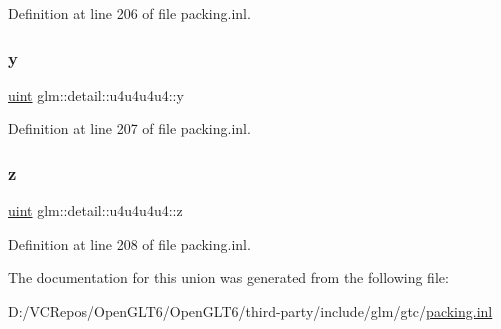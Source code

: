 Definition at line 206 of file packing.\+inl.

\mbox{\label{unionglm_1_1detail_1_1u4u4u4u4_a1c5a971d31d261db43863e8e95d81ecb}} 
\subsubsection{\texorpdfstring{y}{y}}
{\footnotesize\ttfamily \mbox{\hyperlink{group__core__precision_ga4fd29415871152bfb5abd588334147c8}{uint}} glm\+::detail\+::u4u4u4u4\+::y}



Definition at line 207 of file packing.\+inl.

\mbox{\label{unionglm_1_1detail_1_1u4u4u4u4_a1635b8d41a367114239565da102ad6b9}} 
\subsubsection{\texorpdfstring{z}{z}}
{\footnotesize\ttfamily \mbox{\hyperlink{group__core__precision_ga4fd29415871152bfb5abd588334147c8}{uint}} glm\+::detail\+::u4u4u4u4\+::z}



Definition at line 208 of file packing.\+inl.



The documentation for this union was generated from the following file\+:\begin{DoxyCompactItemize}
\item 
D\+:/\+V\+C\+Repos/\+Open\+G\+L\+T6/\+Open\+G\+L\+T6/third-\/party/include/glm/gtc/\mbox{\hyperlink{packing_8inl}{packing.\+inl}}\end{DoxyCompactItemize}
